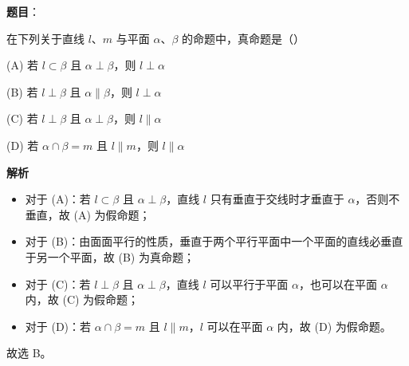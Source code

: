 \begin{answer}

\textbf{题目}：

在下列关于直线 $l$、$m$ 与平面 $\alpha$、$\beta$ 的命题中，真命题是（\qquad）

(A) 若 $l \subset \beta$ 且 $\alpha \perp \beta$，则 $l \perp \alpha$

(B) 若 $l \perp \beta$ 且 $\alpha \parallel \beta$，则 $l \perp \alpha$

(C) 若 $l \perp \beta$ 且 $\alpha \perp \beta$，则 $l \parallel \alpha$

(D) 若 $\alpha \cap \beta = m$ 且 $l \parallel m$，则 $l \parallel \alpha$

\textbf{解析}

\begin{itemize}
\item 对于 (A)：若 $l \subset \beta$ 且 $\alpha \perp \beta$，直线 $l$ 只有垂直于交线时才垂直于 $\alpha$，否则不垂直，故 (A) 为假命题；
\item 对于 (B)：由面面平行的性质，垂直于两个平行平面中一个平面的直线必垂直于另一个平面，故 (B) 为真命题；
\item 对于 (C)：若 $l \perp \beta$ 且 $\alpha \perp \beta$，直线 $l$ 可以平行于平面 $\alpha$，也可以在平面 $\alpha$ 内，故 (C) 为假命题；
\item 对于 (D)：若 $\alpha \cap \beta = m$ 且 $l \parallel m$，$l$ 可以在平面 $\alpha$ 内，故 (D) 为假命题。
\end{itemize}

故选 B。


\end{answer}
